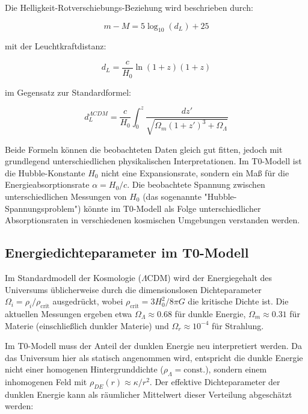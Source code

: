 \documentclass[a4paper,12pt]{article}
\theoremstyle{definition}
\theoremstyle{remark}
\begin{document}
	Die Helligkeit-Rotverschiebungs-Beziehung wird beschrieben durch:
	
	\begin{equation}
		m - M = 5 \log_{10}(d_L) + 25
	\end{equation}
	
	mit der Leuchtkraftdistanz:
	
	\begin{equation}
		d_L = \frac{c}{H_0} \ln(1+z) (1+z)
	\end{equation}
	
	im Gegensatz zur Standardformel:
	
	\begin{equation}
		d_L^{\Lambda CDM} = \frac{c}{H_0} \int_0^z \frac{dz'}{\sqrt{\Omega_m(1+z')^3 + \Omega_{\Lambda}}}
	\end{equation}
	
	Beide Formeln können die beobachteten Daten gleich gut fitten, jedoch mit grundlegend unterschiedlichen physikalischen Interpretationen. Im T0-Modell ist die Hubble-Konstante $H_0$ nicht eine Expansionsrate, sondern ein Maß für die Energieabsorptionsrate $\alpha = H_0/c$. Die beobachtete Spannung zwischen unterschiedlichen Messungen von $H_0$ (das sogenannte "Hubble-Spannungsproblem") könnte im T0-Modell als Folge unterschiedlicher Absorptionsraten in verschiedenen kosmischen Umgebungen verstanden werden.
	
	\subsection{Energiedichteparameter im T0-Modell}
	
	Im Standardmodell der Kosmologie ($\Lambda$CDM) wird der Energiegehalt des Universums üblicherweise durch die dimensionslosen Dichteparameter $\Omega_i = \rho_i/\rho_{\text{crit}}$ ausgedrückt, wobei $\rho_{\text{crit}} = 3H_0^2/8\pi G$ die kritische Dichte ist. Die aktuellen Messungen ergeben etwa $\Omega_{\Lambda} \approx 0.68$ für dunkle Energie, $\Omega_m \approx 0.31$ für Materie (einschließlich dunkler Materie) und $\Omega_r \approx 10^{-4}$ für Strahlung.
	
	Im T0-Modell muss der Anteil der dunklen Energie neu interpretiert werden. Da das Universum hier als statisch angenommen wird, entspricht die dunkle Energie nicht einer homogenen Hintergrunddichte ($\rho_{\Lambda} = \text{const.}$), sondern einem inhomogenen Feld mit $\rho_{DE}(r) \approx \kappa/r^2$. Der effektive Dichteparameter der dunklen Energie kann als räumlicher Mittelwert dieser Verteilung abgeschätzt werden:
	
\end{document}
